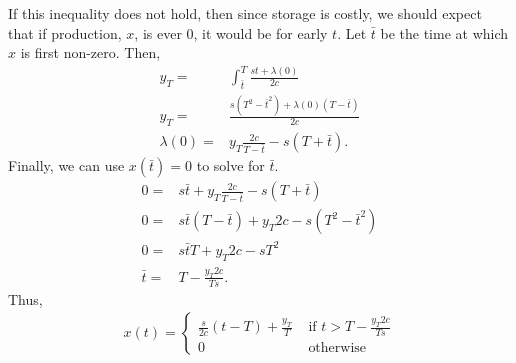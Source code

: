 \begin{example}[Inventory]
  If this inequality does not hold, then since storage is costly, we
  should expect that if production, $x$, is ever $0$, it would be
  for early $t$. Let $\bar{t}$ be the time at which $x$ is first
  non-zero. Then,
  \begin{align*}
    y_T = & \int_{\bar{t}}^T \frac{st + \lambda(0)}{2c} \\
    y_T = & \frac{s(T^2 - \bar{t}^2) + \lambda(0) (T-\bar{t})}{2c} \\
    \lambda(0) = & y_T \frac{2c}{T-\bar{t}} - s(T+\bar{t}).
  \end{align*}
  Finally, we can use $x(\bar{t}) = 0$ to solve for $\bar{t}$.
  \begin{align*}
    0 = & s\bar{t} + y_T \frac{2c}{T-\bar{t}} - s(T+\bar{t})
    \\
    0 = & s\bar{t}(T-\bar{t}) + y_T 2c - s (T^2 - \bar{t}^2) \\
    0 = & s \bar{t} T + y_T 2c - s T^2 \\
    \bar{t} = & T - \frac{y_T 2c}{T s}.
  \end{align*}
  Thus,
  \begin{align*}
    x(t) = \begin{cases} 
      \frac{s}{2c} (t - T) + \frac{y_T}{T} & \text{ if } t > T -
      \frac{y_T 2c}{T s} \\
      0 & \text{ otherwise }
    \end{cases}
  \end{align*}      
\end{example}



